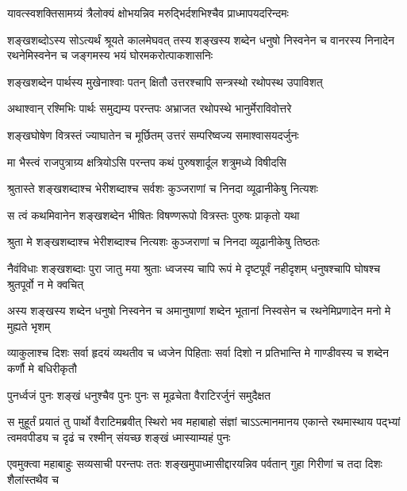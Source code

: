 \twolineshloka
{यावत्स्वशक्तिसामग्र्यं त्रैलोक्यं क्षोभयन्निव}
{मरुद्भिर्दशभिश्चैव प्राध्मापयदरिन्दमः}


\onelineshloka
{शङ्खशब्दोऽस्य सोऽत्यर्थं श्रूयते कालमेघवत्}
\threelineshloka
{तस्य शङ्खस्य शब्देन धनुषो निस्वनेन च}
{वानरस्य निनादेन रथनेमिस्वनेन च}
{जङ्गमस्य भयं घोरमकरोत्पाकशासनिः}


\twolineshloka
{शङ्खशब्देन पार्थस्य मुखेनाश्वाः पतन् क्षितौ}
{उत्तरश्चापि सन्त्रस्थो रथोपस्थ उपाविशत्}


\twolineshloka
{अथाश्वान् रश्मिभिः पार्थः समुद्यम्य परन्तपः}
{अभ्राजत रथोपस्थे भानुर्मेराविवोत्तरे}


\twolineshloka
{शङ्खघोषेण वित्रस्तं ज्याघातेन च मूर्छितम्}
{उत्तरं सम्परिष्वज्य समाश्वासयदर्जुनः}


\twolineshloka
{मा भैस्त्वं राजपुत्राग्र्य क्षत्रियोऽसि परन्तप}
{कथं पुरुषशार्दूल शत्रुमध्ये विषीदसि}


\twolineshloka
{श्रुतास्ते शङ्खशब्दाश्च भेरीशब्दाश्च सर्वशः}
{कुञ्जराणां च निनदा व्यूढानीकेषु नित्यशः}


\twolineshloka
{स त्वं कथमिवानेन शङ्खशब्देन भीषितः}
{विषण्णरूपो वित्रस्तः पुरुषः प्राकृतो यथा}




\twolineshloka
{श्रुता मे शङ्खशब्दाश्च भेरीशब्दाश्च नित्यशः}
{कुञ्जराणां च निनदा व्यूढानीकेषु तिष्ठतः}


\threelineshloka
{नैवंविधाः शङ्खशब्दाः पुरा जातु मया श्रुताः}
{ध्वजस्य चापि रूपं मे दृष्टपूर्वं नहीदृशम्}
{धनुषश्चापि घोषश्च श्रुतपूर्वो न मे क्वचित्}


\threelineshloka
{अस्य शङ्खस्य शब्देन धनुषो निस्वनेन च}
{अमानुषाणां शब्देन भूतानां निस्वसेन च}
{रथनेमिप्रणादेन मनो मे मुह्यते भृशम्}


\threelineshloka
{व्याकुलाश्च दिशः सर्वा हृदयं व्यथतीव च}
{ध्वजेन पिहिताः सर्वा दिशो न प्रतिभान्ति मे}
{गाण्डीवस्य च शब्देन कर्णौ मे बधिरीकृतौ}



\twolineshloka
{पुनर्ध्वजं पुनः शङ्खं धनुश्चैव पुनः पुनः}
{स मूढचेता वैराटिरर्जुनं समुदैक्षत}


\onelineshloka
{स मुहूर्तं प्रयातं तु पार्थो वैराटिमब्रवीत्}
\threelineshloka
{स्थिरो भव महाबाहो संज्ञां चाऽऽत्मानमानय}
{एकान्ते रथमास्थाय पद्भ्यां त्वमवपीड्य च}
{दृढं च रश्मीन् संयच्छ शङ्खं ध्मास्याम्यहं पुनः}


\threelineshloka
{एवमुक्त्वा महाबाहुः सव्यसाची परन्तपः}
{ततः शङ्खमुपाध्मासीद्दारयन्निव पर्वतान्}
{गुहा गिरीणां च तदा दिशः शैलांस्तथैव च}


